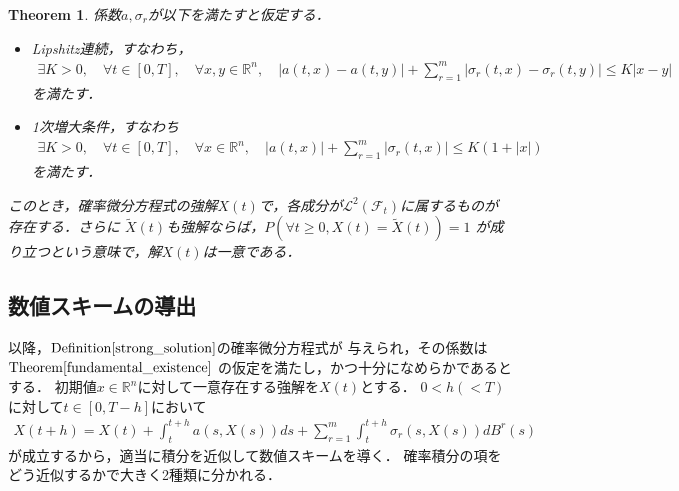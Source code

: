 \documentclass[dvipdfmx,autodetect-engine]{jsarticle}
\newtheorem{theorem}{Theorem}[section]
\theoremstyle{remark}
\theoremstyle{definition}
\newcommand{\R}{\mathbb{R}}
\newcommand{\abs}[1]{\left\lvert#1\right\rvert}
\begin{document}
\begin{theorem}\label{fundamental_existence}
    係数$a,\sigma_{r}$が以下を満たすと仮定する．
    \begin{itemize}
        \item Lipshitz連続，すなわち，
        \begin{align}
            \exists K>0,\quad \forall t \in [0,T],\quad \forall x,y \in \R^{n},\quad
            \abs{a(t,x)-a(t,y)} + \sum_{r=1}^{m} \abs{\sigma_{r}(t,x) - \sigma_{r}(t,y)} 
            \leq K\abs{x-y}
        \end{align}
        を満たす．
        \item 1次増大条件，すなわち
        \begin{align}
            \exists K>0,\quad \forall t \in [0,T],\quad \forall x\in \R^{n},\quad
            \abs{a(t,x)} + \sum_{r=1}^{m} \abs{\sigma_{r}(t,x)} \leq K(1+\abs{x})
        \end{align}
        を満たす．
    \end{itemize}
    このとき，確率微分方程式の強解$X(t)$で，各成分が$\mathcal{L}^2 (\mathcal{F}_{t})$に属するものが
    存在する．さらに
    $\tilde{X}(t)$も強解ならば，$P(\forall t \geq 0,X(t)=\tilde{X}(t))=1$
    が成り立つという意味で，解$X(t)$は一意である．
\end{theorem}


\subsection{数値スキームの導出}
以降，$\mathrm{Definition}\ref{strong_solution}$の確率微分方程式が
与えられ，その係数は$\mathrm{Theorem}\ref{fundamental_existence}$
の仮定を満たし，かつ十分になめらかであるとする．
初期値$x \in \R^n$に対して一意存在する強解を$X(t)$とする．
$0<h(<T)$に対して$t \in [0,T-h]$において
\begin{align}
    X(t+h) = X(t) + \int_{t}^{t+h} a(s,X(s))ds + 
    \sum_{r=1}^{m} \int_{t}^{t+h} \sigma_{r}(s,X(s))dB^{r}(s)
\end{align}
が成立するから，適当に積分を近似して数値スキームを導く．
確率積分の項をどう近似するかで大きく2種類に分かれる．
\end{document}
